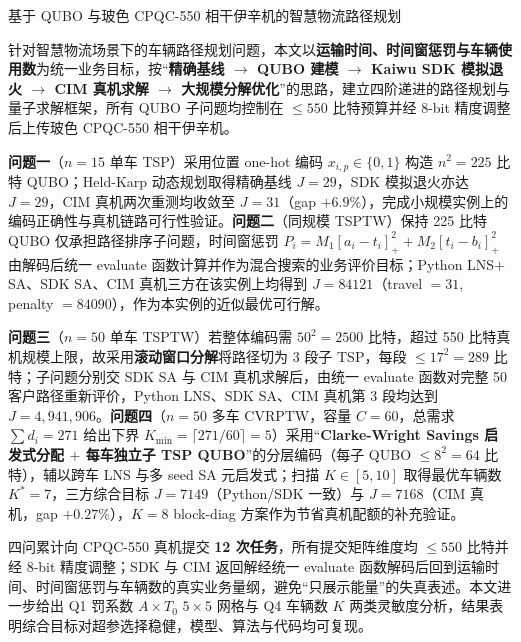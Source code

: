 \documentclass[UTF8,12pt,a4paper]{ctexart}
\begin{document}
\begin{center}
{\fontsize{16pt}{20pt}\selectfont
基于 QUBO 与玻色 CPQC-550 相干伊辛机的智慧物流路径规划}
\end{center}
\vspace{0.6em}

\vspace{0.4em}

针对智慧物流场景下的车辆路径规划问题，本文以\textbf{运输时间、时间窗惩罚与车辆使用数}为统一业务目标，按``\textbf{精确基线 $\rightarrow$ QUBO 建模 $\rightarrow$ Kaiwu SDK 模拟退火 $\rightarrow$ CIM 真机求解 $\rightarrow$ 大规模分解优化}''的思路，建立四阶递进的路径规划与量子求解框架，所有 QUBO 子问题均控制在 $\le 550$ 比特预算并经 8-bit 精度调整后上传玻色 CPQC-550 相干伊辛机。

\textbf{问题一}（$n=15$ 单车 TSP）采用位置 one-hot 编码 $x_{i,p}\!\in\!\{0,1\}$ 构造 $n^{2}=225$ 比特 QUBO；Held-Karp 动态规划取得精确基线 $J=29$，SDK 模拟退火亦达 $J=29$，CIM 真机两次重测均收敛至 $J=31$（gap $+6.9\%$），完成小规模实例上的编码正确性与真机链路可行性验证。\textbf{问题二}（同规模 TSPTW）保持 225 比特 QUBO 仅承担路径排序子问题，时间窗惩罚 $P_i=M_1[a_i\!-\!t_i]_+^2+M_2[t_i\!-\!b_i]_+^2$ 由解码后统一 evaluate 函数计算并作为混合搜索的业务评价目标；Python LNS$+$SA、SDK SA、CIM 真机三方在该实例上均得到 $J=84121$（travel $=31$, penalty $=84090$），作为本实例的近似最优可行解。

\textbf{问题三}（$n=50$ 单车 TSPTW）若整体编码需 $50^{2}=2500$ 比特，超过 550 比特真机规模上限，故采用\textbf{滚动窗口分解}将路径切为 3 段子 TSP，每段 $\le 17^{2}=289$ 比特；子问题分别交 SDK SA 与 CIM 真机求解后，由统一 evaluate 函数对完整 50 客户路径重新评价，Python LNS、SDK SA、CIM 真机第 3 段均达到 $J=4{,}941{,}906$。\textbf{问题四}（$n=50$ 多车 CVRPTW，容量 $C=60$，总需求 $\sum d_i=271$ 给出下界 $K_{\min}=\lceil 271/60\rceil=5$）采用``\textbf{Clarke-Wright Savings 启发式分配 $+$ 每车独立子 TSP QUBO}''的分层编码（每子 QUBO $\le 8^{2}=64$ 比特），辅以跨车 LNS 与多 seed SA 元启发式；扫描 $K\!\in\![5,10]$ 取得最优车辆数 $K^{*}=7$，三方综合目标 $J=7149$（Python/SDK 一致）与 $J=7168$（CIM 真机，gap $+0.27\%$），$K=8$ block-diag 方案作为节省真机配额的补充验证。

四问累计向 CPQC-550 真机提交 \textbf{12 次任务}，所有提交矩阵维度均 $\le 550$ 比特并经 8-bit 精度调整；SDK 与 CIM 返回解经统一 evaluate 函数解码后回到运输时间、时间窗惩罚与车辆数的真实业务量纲，避免``只展示能量''的失真表述。本文进一步给出 Q1 罚系数 $A\!\times\!T_0$ $5\!\times\!5$ 网格与 Q4 车辆数 $K$ 两类灵敏度分析，结果表明综合目标对超参选择稳健，模型、算法与代码均可复现。
\end{document}
